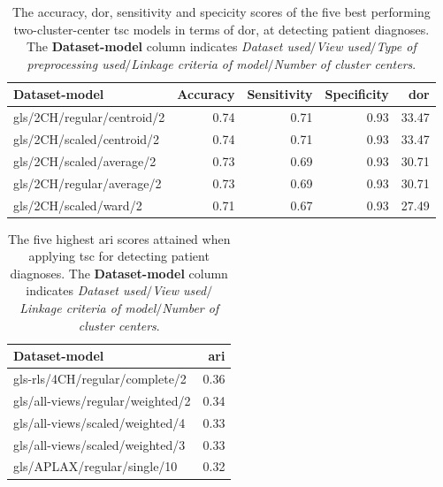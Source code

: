 \begin{table}
    \centering
    \begin{tabular}{lrrrr}
        \toprule
        Dataset-model             &  Accuracy &  Sensitivity &  Specificity &   \acrshort{dor} \\
        \midrule
        gls/2CH/regular/centroid/2 &      0.74 &         0.71 &         0.93 & 33.47 \\
        gls/2CH/scaled/centroid/2  &      0.74 &         0.71 &         0.93 & 33.47 \\
        gls/2CH/scaled/average/2   &      0.73 &         0.69 &         0.93 & 30.71 \\
        gls/2CH/regular/average/2  &      0.73 &         0.69 &         0.93 & 30.71 \\
        gls/2CH/scaled/ward/2      &      0.71 &         0.67 &         0.93 & 27.49 \\
        \bottomrule
    \end{tabular}
    \caption{The accuracy, \acrshort{dor}, sensitivity and specicity scores of the five best performing two-cluster-center \acrshort{tsc} models in terms of \acrshort{dor}, at detecting patient diagnoses.
             The \textbf{Dataset-model} column indicates 
             \textit{Dataset used}$/$\textit{View used}$/$\textit{Type of preprocessing used}$/$\textit{Linkage criteria of model}$/$\textit{Number of cluster centers}.}
    \label{tab:tsc_ind_dor_sens_spec_dist}
\end{table}

\begin{table}
    \centering
    \begin{tabular}{lr}
        \toprule
        Dataset-model                   &  \acrshort{ari} \\
        \midrule
        gls-rls/4CH/regular/complete/2   & 0.36 \\
        gls/all-views/regular/weighted/2 & 0.34 \\
        gls/all-views/scaled/weighted/4  & 0.33 \\
        gls/all-views/scaled/weighted/3  & 0.33 \\
        gls/APLAX/regular/single/10      & 0.32 \\
        \bottomrule
    \end{tabular}
    \caption{The five highest \acrshort{ari} scores attained when applying \acrshort{tsc} for detecting patient diagnoses.
             The \textbf{Dataset-model} column indicates \textit{Dataset used}$/$\textit{View used}$/$\textit{Linkage criteria of model}$/$\textit{Number of cluster centers}.}
    \label{tab:tsc_ind_ari}
\end{table}

